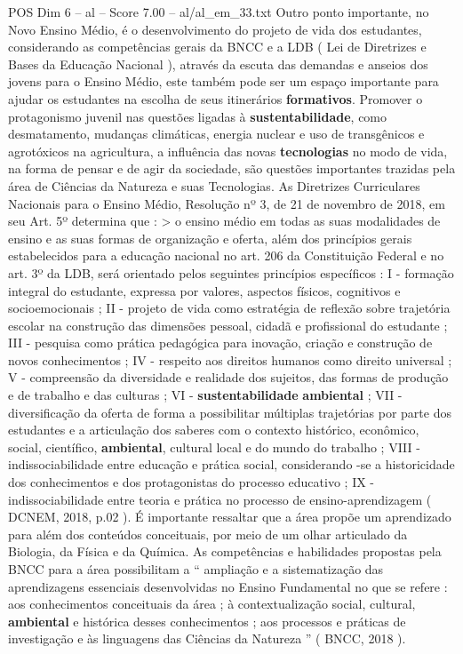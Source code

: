 \begin{textsample}{POS Dim 6 – al – Score 7.00 – al/al\_em\_33.txt}
Outro ponto importante, no Novo Ensino Médio, é o desenvolvimento do projeto de vida dos estudantes, considerando as competências gerais da BNCC e a LDB ( Lei de Diretrizes e Bases da Educação Nacional ), através da escuta das demandas e anseios dos jovens para o Ensino Médio, este também pode ser um espaço importante para ajudar os estudantes na escolha de seus itinerários \textbf{formativos}.
Promover o protagonismo juvenil nas questões ligadas à \textbf{sustentabilidade}, como desmatamento, mudanças climáticas, energia nuclear e uso de transgênicos e agrotóxicos na agricultura, a influência das novas \textbf{tecnologias} no modo de vida, na forma de pensar e de agir da sociedade, são questões importantes trazidas pela área de Ciências da Natureza e suas Tecnologias.
As Diretrizes Curriculares Nacionais para o Ensino Médio, Resolução nº 3, de 21 de novembro de 2018, em seu Art. 5º determina que : > o ensino médio em todas as suas modalidades de ensino e as suas formas de organização e oferta, além dos princípios gerais estabelecidos para a educação nacional no art. 206 da Constituição Federal e no art. 3º da LDB, será orientado pelos seguintes princípios específicos : I - formação integral do estudante, expressa por valores, aspectos físicos, cognitivos e socioemocionais ; II - projeto de vida como estratégia de reflexão sobre trajetória escolar na construção das dimensões pessoal, cidadã e profissional do estudante ; III - pesquisa como prática pedagógica para inovação, criação e construção de novos conhecimentos ; IV - respeito aos direitos humanos como direito universal ; V - compreensão da diversidade e realidade dos sujeitos, das formas de produção e de trabalho e das culturas ; VI - \textbf{sustentabilidade} \textbf{ambiental} ; VII - diversificação da oferta de forma a possibilitar múltiplas trajetórias por parte dos estudantes e a articulação dos saberes com o contexto histórico, econômico, social, científico, \textbf{ambiental}, cultural local e do mundo do trabalho ; VIII - indissociabilidade entre educação e prática social, considerando -se a historicidade dos conhecimentos e dos protagonistas do processo educativo ; IX - indissociabilidade entre teoria e prática no processo de ensino-aprendizagem ( DCNEM, 2018, p.02 ).
É importante ressaltar que a área propõe um aprendizado para além dos conteúdos conceituais, por meio de um olhar articulado da Biologia, da Física e da Química.
As competências e habilidades propostas pela BNCC para a área possibilitam a “ ampliação e a sistematização das aprendizagens essenciais desenvolvidas no Ensino Fundamental no que se refere : aos conhecimentos conceituais da área ; à contextualização social, cultural, \textbf{ambiental} e histórica desses conhecimentos ; aos processos e práticas de investigação e às linguagens das Ciências da Natureza ” ( BNCC, 2018 ).

\end{textsample}
